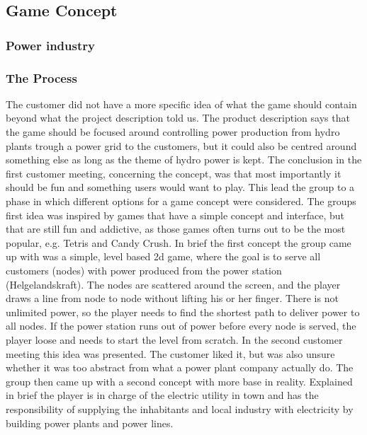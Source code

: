 \subsection{Game Concept}

\subsubsection{Power industry}

\subsubsection{The Process}


The customer did not have a more specific idea of what the game should contain beyond what the project description told us. The product description says that the game should be focused around controlling power production from hydro plants trough a power grid to the customers, but it could also be centred around something else as long as the theme of hydro power is kept. The conclusion in the first customer meeting, concerning the concept, was that most importantly it should be fun and something users would want to play. This lead the group to a phase in which different options for a game concept were considered. The groups first idea was inspired by games that have a simple concept and interface, but that are still fun and addictive, as those games often turns out to be the most popular, e.g. Tetris and Candy Crush. In brief the first concept the group came up with was a simple, level based 2d game, where the goal is to serve all customers (nodes) with power produced from the power station (Helgelandskraft). The nodes are scattered around the screen, and the player draws a line from node to node without lifting his or her finger. There is not unlimited power, so the player needs to find the shortest path to deliver power to all nodes. If the power station runs out of power before every node is served, the player loose and needs to start the level from scratch. In the second customer meeting this idea was presented. The customer liked it, but was also unsure whether it was too abstract from what a power plant company actually do. The group then came up with a second concept with more base in reality. Explained in brief the player is in charge of the electric utility in town and has the responsibility of supplying the inhabitants and local industry with electricity by building power plants and power lines.
\newline

